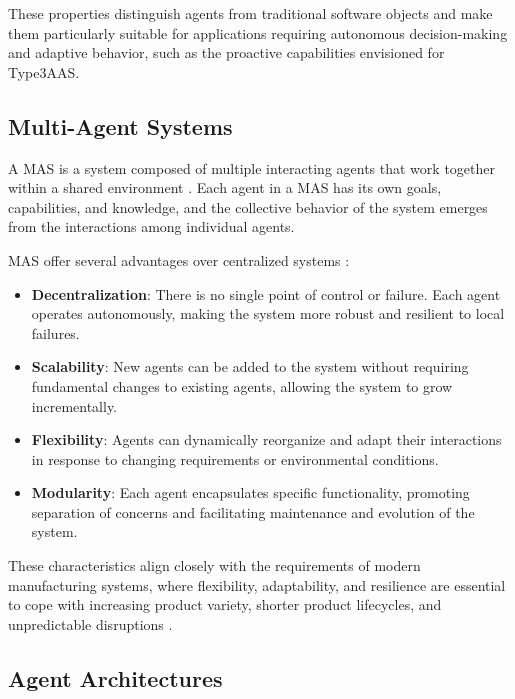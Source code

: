 These properties distinguish agents from traditional software objects and make them particularly suitable for applications requiring autonomous decision-making and adaptive behavior, such as the proactive capabilities envisioned for \ac{Type3AAS}.

\subsection{Multi-Agent Systems}
\label{subsec:mas_definition}

A \ac{MAS} is a system composed of multiple interacting agents that work together within a shared environment \cite{wooldridge2009introduction}. Each agent in a \ac{MAS} has its own goals, capabilities, and knowledge, and the collective behavior of the system emerges from the interactions among individual agents.

\ac{MAS} offer several advantages over centralized systems \cite{leitao2016smart}:

\begin{itemize}
    \item \textbf{Decentralization}: There is no single point of control or failure. Each agent operates autonomously, making the system more robust and resilient to local failures.
    
    \item \textbf{Scalability}: New agents can be added to the system without requiring fundamental changes to existing agents, allowing the system to grow incrementally.
    
    \item \textbf{Flexibility}: Agents can dynamically reorganize and adapt their interactions in response to changing requirements or environmental conditions.
    
    \item \textbf{Modularity}: Each agent encapsulates specific functionality, promoting separation of concerns and facilitating maintenance and evolution of the system.
\end{itemize}

These characteristics align closely with the requirements of modern manufacturing systems, where flexibility, adaptability, and resilience are essential to cope with increasing product variety, shorter product lifecycles, and unpredictable disruptions \cite{leitao2016smart}.

\subsection{Agent Architectures}
\label{subsec:agent_architectures}

